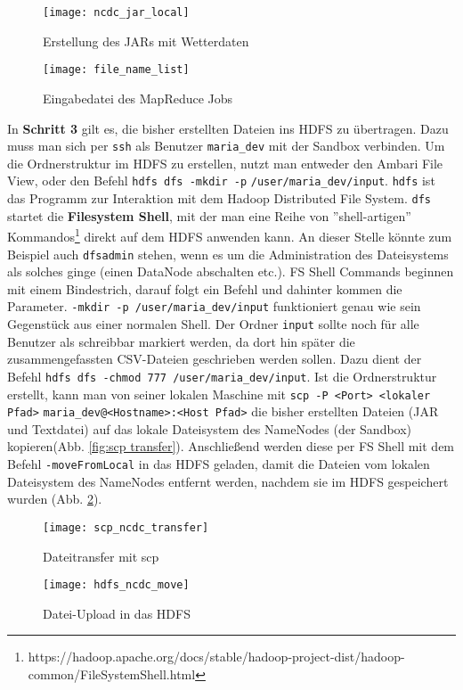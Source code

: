 \begin{figure}[ht]
    \centering
    \texttt{[image: ncdc\_jar\_local]}
    \caption[Erstellung des JARs mit Wetterdaten]{Erstellung des JARs mit Wetterdaten}
    \label{fig:ncdc jar local}
    \texttt{[image: file\_name\_list]}
    \caption[Eingabedatei des MapReduce Jobs]{Eingabedatei des MapReduce Jobs}
    \label{fig:file names txt local}
\end{figure}

In \textbf{Schritt 3} gilt es, die bisher erstellten Dateien ins HDFS zu übertragen. Dazu muss man sich per \verb|ssh| als Benutzer \verb|maria_dev| mit der Sandbox verbinden. Um die Ordnerstruktur im HDFS zu erstellen, nutzt man entweder den Ambari File View, oder den Befehl \verb|hdfs dfs -mkdir -p| \verb|/user/maria_dev/input|. \verb|hdfs| ist das Programm zur Interaktion mit dem Hadoop Distributed File System. \verb|dfs| startet die \textbf{Filesystem Shell}, mit der man eine Reihe von ''shell-artigen'' Kommandos\footnote{https://hadoop.apache.org/docs/stable/hadoop-project-dist/hadoop-common/FileSystemShell.html} direkt auf dem HDFS anwenden kann. An dieser Stelle könnte zum Beispiel auch \verb|dfsadmin| stehen, wenn es um die Administration des Dateisystems als solches ginge (einen DataNode abschalten etc.). FS Shell Commands beginnen mit einem Bindestrich, darauf folgt ein Befehl und dahinter kommen die Parameter. \verb|-mkdir -p /user/maria_dev/input| funktioniert genau wie sein Gegenstück aus einer normalen Shell. Der Ordner \verb|input| sollte noch für alle Benutzer als schreibbar markiert werden, da dort hin später die zusammengefassten CSV-Dateien geschrieben werden sollen. Dazu dient der Befehl \verb|hdfs dfs -chmod 777 /user/maria_dev/input|. Ist die Ordnerstruktur erstellt, kann man von seiner lokalen Maschine mit \verb|scp -P <Port> <lokaler Pfad>| \verb|maria_dev@<Hostname>:<Host Pfad>| die bisher erstellten Dateien (JAR und Textdatei) auf das lokale Dateisystem des NameNodes (der Sandbox) kopieren(Abb. \ref{fig:scp transfer}). Anschließend werden diese per FS Shell mit dem Befehl \verb|-moveFromLocal| in das HDFS geladen, damit die Dateien vom lokalen Dateisystem des NameNodes entfernt werden, nachdem sie im HDFS gespeichert wurden (Abb. \ref{fig:hdfs move}).

\begin{figure}[ht]
    \centering
    \texttt{[image: scp\_ncdc\_transfer]}
    \caption[Dateitransfer mit scp]{Dateitransfer mit scp}
    \label{fig:scp transfer}
    \texttt{[image: hdfs\_ncdc\_move]}
    \caption[Datei-Upload in das HDFS]{Datei-Upload in das HDFS}
    \label{fig:hdfs move}
\end{figure}

